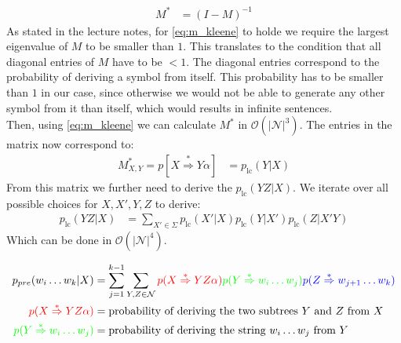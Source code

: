 \documentclass[a4paper,12pt]{ETHexercise}
\begin{document}
\begin{question}
\begin{subquestion}
\begin{align}
			M^*         & = (I - M)^{-1} \label{eq:m_kleene}
		\end{align}
		As stated in the lecture notes, for \cref*{eq:m_kleene} to holde we require the largest eigenvalue of $M$ to be smaller than $1$. This translates to the condition that all diagonal entries of $M$ have to be $< 1$. The diagonal entries correspond to the probability of deriving a symbol from itself. This probability has to be smaller than $1$ in our case, since otherwise we would not be able to generate any other symbol from it than itself, which would results in infinite sentences.\\
		Then, using \cref{eq:m_kleene} we can calculate $M^*$ in $\mathcal{O}(|\mathcal{N}|^3)$. The entries in the matrix now correspond to:
		\begin{align}
			M^*_{X,Y} = p[X \overset{*}{\Rightarrow} Y\alpha] & = p_{\text{lc}}(Y | X)
		\end{align}
		From this matrix we further need to derive the $p_{\text{lc}}(YZ | X)$. We iterate over all possible choices for $X, X',Y,Z$ to derive:
		\begin{align}
			p_{\text{lc}}(YZ | X) & = \sum_{X' \in \Sigma} p_{\text{lc}}(X' | X) p_{\text{lc}}(Y | X') p_{\text{lc}}(Z | X'Y) \label{eq:lc}
		\end{align}
		Which can be done in $\mathcal{O}(|\mathcal{N}|^4)$.
	\end{subquestion}
	\begin{subquestion}
		\begin{align}
			p_{pre}(w_i \dots w_k | X)                                    & = \sum_{j=1}^{k-1} \sum_{Y,Z \in \mathcal{N}} {\color{red} p(X \overset{*}{\Rightarrow} YZ\alpha)}{\color{green}p(Y \overset{*}{\Rightarrow} w_i \dots w_j)}{\color{blue} p(Z \overset{*}{\Rightarrow} w_{j+1} \dots w_k)} \label{eq:pre} \\
			{\color{red}p(X \overset{*}{\Rightarrow} YZ\alpha)}           & = \text{probability of deriving the two subtrees $Y$ and $Z$ from $X$} \label{eq:pre2}                                                                                                                                                    \\
			{\color{green}p(Y \overset{*}{\Rightarrow} w_i \dots w_j)}    & = \text{probability of deriving the string $w_i \dots w_j$ from $Y$} \label{eq:pre3}                                                                                                                                                      \\

\end{align}
\end{subquestion}
\end{question}
\end{document}
